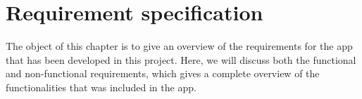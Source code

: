 \chapter{Requirement specification}
\label {sec:recSpecification}

The object of this chapter is to give an overview of the requirements for the app that has been developed in this project. Here, we will discuss both the functional and non-functional requirements, which gives a complete overview of the functionalities that was included in the app.



\newpage
